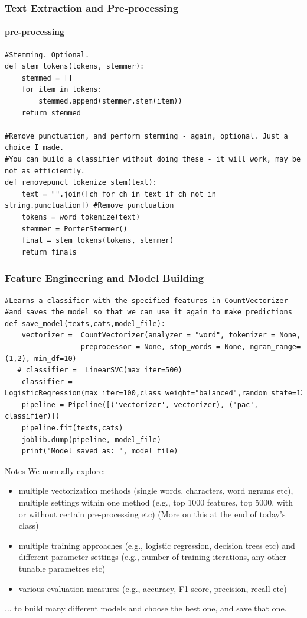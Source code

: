 \documentclass{beamer}
\begin{document}
\begin{frame}[fragile]
\frametitle{Text Extraction and Pre-processing}
\framesubtitle{pre-processing}
\tiny
\begin{verbatim}
#Stemming. Optional.
def stem_tokens(tokens, stemmer):
    stemmed = []
    for item in tokens:
        stemmed.append(stemmer.stem(item))
    return stemmed

#Remove punctuation, and perform stemming - again, optional. Just a choice I made.
#You can build a classifier without doing these - it will work, may be not as efficiently.
def removepunct_tokenize_stem(text):
    text = "".join([ch for ch in text if ch not in string.punctuation]) #Remove punctuation
    tokens = word_tokenize(text)
    stemmer = PorterStemmer()
    final = stem_tokens(tokens, stemmer)
    return finals
\end{verbatim}
\end{frame}

\begin{frame}[fragile]
\frametitle{Feature Engineering and Model Building}
\tiny
\begin{verbatim}
#Learns a classifier with the specified features in CountVectorizer 
#and saves the model so that we can use it again to make predictions
def save_model(texts,cats,model_file):
    vectorizer =  CountVectorizer(analyzer = "word", tokenizer = None, 
                  preprocessor = None, stop_words = None, ngram_range=(1,2), min_df=10)
   # classifier =  LinearSVC(max_iter=500)
    classifier = LogisticRegression(max_iter=100,class_weight="balanced",random_state=1234)
    pipeline = Pipeline([('vectorizer', vectorizer), ('pac', classifier)])
    pipeline.fit(texts,cats)
    joblib.dump(pipeline, model_file)
    print("Model saved as: ", model_file)
\end{verbatim}
\end{frame}

\begin{frame}{Notes}
We normally explore: 
    \begin{itemize}
    \item multiple vectorization methods (single words, characters, word ngrams etc), multiple settings within one method (e.g., top 1000 features, top 5000, with or without certain pre-processing etc) (More on this at the end of today's class)
    \item multiple training approaches (e.g., logistic regression, decision trees etc) and different parameter settings (e.g., number of training iterations, any other tunable parametres etc)
    \item various evaluation measures (e.g., accuracy, F1 score, precision, recall etc)
    \end{itemize}
... to build many different models and choose the best one, and save that one. 
\end{frame}
\end{document}
